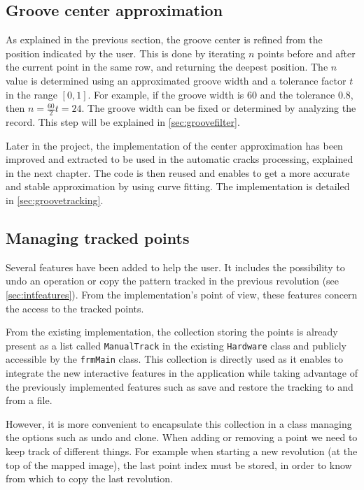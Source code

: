 \subsection{Groove center approximation}
\label{sec:centerapprox}

As explained in the previous section, the groove center is refined from the position indicated by the user. This is done by iterating $n$ points before and after the current point in the same row, and returning the deepest position. The $n$ value is determined using an approximated groove width and a tolerance factor $t$ in the range $[0,1]$. For example, if the groove width is $60$ and the tolerance $0.8$, then $n = \frac{60}{2} t = 24$. The groove width can be fixed or determined by analyzing the record. This step will be explained in \autoref{sec:groovefilter}.

Later in the project, the implementation of the center approximation has been improved and extracted to be used in the automatic cracks processing, explained in the next chapter. The code is then reused and enables to get a more accurate and stable approximation by using curve fitting. The implementation is detailed in \autoref{sec:groovetracking}.

\subsection{Managing tracked points}

Several features have been added to help the user. It includes the possibility to undo an operation or copy the pattern tracked in the previous revolution (see \autoref{sec:intfeatures}). From the implementation's point of view, these features concern the access to the tracked points.

From the existing implementation, the collection storing the points is already present as a list called \texttt{ManualTrack} in the existing \texttt{Hardware} class and publicly accessible by the \texttt{frmMain} class. This collection is directly used as it enables to integrate the new interactive features in the application while taking advantage of the previously implemented features such as save and restore the tracking to and from a file.

However, it is more convenient to encapsulate this collection in a class managing the options such as undo and clone. When adding or removing a point we need to keep track of different things. For example when starting a new revolution (at the top of the mapped image), the last point index must be stored, in order to know from which to copy the last revolution.

